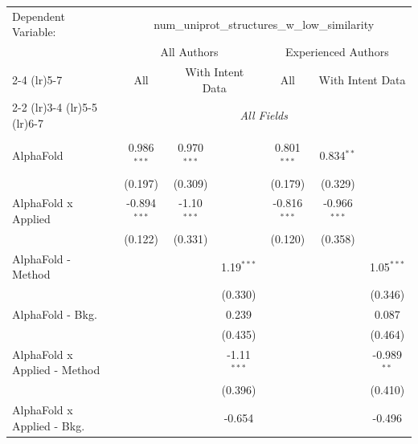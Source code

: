 \begingroup
\centering
\begin{tabular}{lcccccc}
   \tabularnewline \midrule \midrule
   Dependent Variable: & \multicolumn{6}{c}{num\_uniprot\_structures\_w\_low\_similarity}\\
 & \multicolumn{3}{c}{All Authors} & \multicolumn{3}{c}{Experienced Authors} \\
\cmidrule(lr){2-4} \cmidrule(lr){5-7}
 & \multicolumn{1}{c}{All} & \multicolumn{2}{c}{With Intent Data} & \multicolumn{1}{c}{All} & \multicolumn{2}{c}{With Intent Data} \\
\cmidrule(lr){2-2} \cmidrule(lr){3-4} \cmidrule(lr){5-5} \cmidrule(lr){6-7}
 & \multicolumn{6}{c}{\textit{All Fields}} \\ \\
   AlphaFold                      & 0.986$^{***}$  & 0.970$^{***}$ &               & 0.801$^{***}$  & 0.834$^{**}$   &   \\   
                                  & (0.197)        & (0.309)       &               & (0.179)        & (0.329)        &   \\   
   AlphaFold x Applied            & -0.894$^{***}$ & -1.10$^{***}$ &               & -0.816$^{***}$ & -0.966$^{***}$ &   \\   
                                  & (0.122)        & (0.331)       &               & (0.120)        & (0.358)        &   \\   
   AlphaFold - Method             &                &               & 1.19$^{***}$  &                &                & 1.05$^{***}$\\   
                                  &                &               & (0.330)       &                &                & (0.346)\\   
   AlphaFold - Bkg.               &                &               & 0.239         &                &                & 0.087\\   
                                  &                &               & (0.435)       &                &                & (0.464)\\   
   AlphaFold x Applied - Method   &                &               & -1.11$^{***}$ &                &                & -0.989$^{**}$\\   
                                  &                &               & (0.396)       &                &                & (0.410)\\   
   AlphaFold x Applied - Bkg.     &                &               & -0.654        &                &                & -0.496\\   

\end{tabular}

